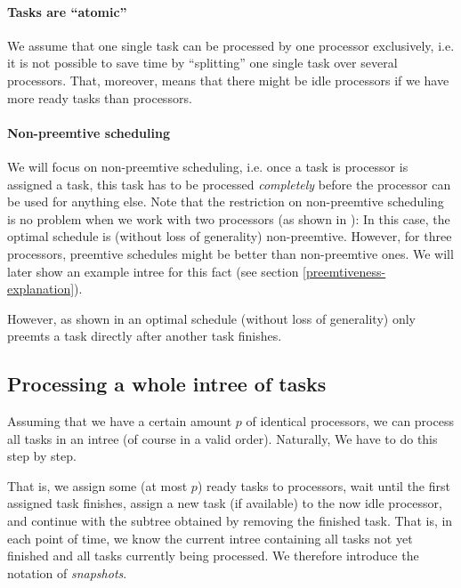 \paragraph{Tasks are ``atomic''}

We assume that one single task can be processed by one processor exclusively, i.e. it is not possible to save time by ``splitting'' one single task over several processors. That, moreover, means that there might be idle processors if we have more ready tasks than processors.

\paragraph{Non-preemtive scheduling}

We will focus on non-preemtive scheduling, i.e. once a task is processor is assigned a task, this task has to be processed \emph{completely} before the processor can be used for anything else. Note that the restriction on non-preemtive scheduling is no problem when we work with two processors (as shown in \cite{chandyreynoldslargepaper1979}): In this case, the optimal schedule is (without loss of generality) non-preemtive. However, for three processors, preemtive schedules might be better than non-preemtive ones. We will later show an example intree for this fact (see section \ref{preemtiveness-explanation}).

However, as shown in \cite{chandyreynoldslargepaper1979} an optimal schedule (without loss of generality) only preemts a task directly after another task finishes.

\subsection{Processing a whole intree of tasks}
\label{sec:processing-an-intree-of-tasks}

Assuming that we have a certain amount $p$ of identical processors, we can process all tasks in an intree (of course in a valid order). Naturally, We have to do this step by step. 

That is, we assign some (at most $p$) ready tasks to processors, wait until the first assigned task finishes, assign a new task (if available) to the now idle processor, and continue with the subtree obtained by removing the finished task. That is, in each point of time, we know the current intree containing all tasks not yet finished and all tasks currently being processed. We therefore introduce the notation of \emph{snapshots}.

